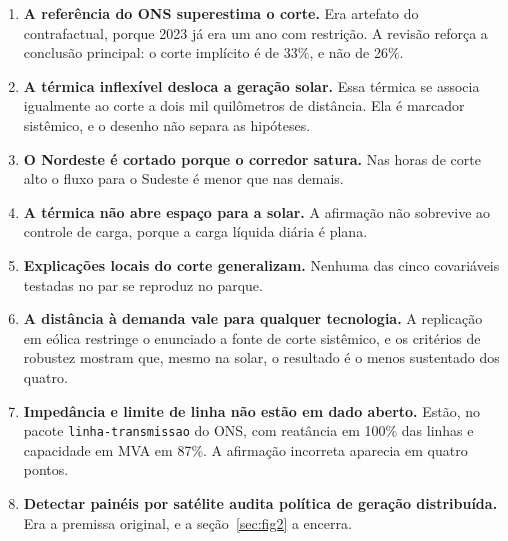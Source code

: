 \begin{enumerate}[leftmargin=1.2em,itemsep=0.3em]
\item \textbf{A referência do ONS superestima o corte.} Era artefato do
contrafactual, porque 2023 já era um ano com restrição. A revisão reforça a
conclusão principal: o corte implícito é de 33\%, e não de 26\%.

\item \textbf{A térmica inflexível desloca a geração solar.} Essa térmica se
associa igualmente ao corte a dois mil quilômetros de distância. Ela é marcador
sistêmico, e o desenho não separa as hipóteses.

\item \textbf{O Nordeste é cortado porque o corredor satura.} Nas horas de corte
alto o fluxo para o Sudeste é menor que nas demais.

\item \textbf{A térmica não abre espaço para a solar.} A afirmação não sobrevive
ao controle de carga, porque a carga líquida diária é plana.

\item \textbf{Explicações locais do corte generalizam.} Nenhuma das cinco
covariáveis testadas no par se reproduz no parque.

\item \textbf{A distância à demanda vale para qualquer tecnologia.} A replicação
em eólica restringe o enunciado a fonte de corte sistêmico, e os critérios de
robustez mostram que, mesmo na solar, o resultado é o menos sustentado dos
quatro.

\item \textbf{Impedância e limite de linha não estão em dado aberto.} Estão, no
pacote \texttt{linha-transmissao} do ONS, com reatância em 100\% das linhas e
capacidade em MVA em 87\%. A afirmação incorreta aparecia em quatro pontos.

\item \textbf{Detectar painéis por satélite audita política de geração
distribuída.} Era a premissa original, e a seção~\ref{sec:fig2} a encerra.
\end{enumerate}
